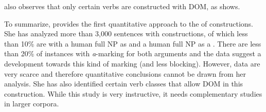 \documentclass[output=paper]{LSP/langsci}
\begin{document}
\citet[166]{Ortiz2011Construcciones} also observes that only certain  verbs are constructed with DOM, as  shows.



\begin{table}
\caption{Verbs with DOM in ditransitive constructions with human direct objects and human indirect objects (\citealt[166]{Ortiz2011Construcciones}; my own translation, KvH)}
\label{11-he-tab:8}
\end{table}


To summarize, \citet{Ortiz2011Construcciones} provides the first quantitative approach to the  of  constructions. She has analyzed more than 3,000 sentences with  constructions, of which less than 10\% are with a human full NP as  and a human full NP as a . There are less than 20\% of instances with \textit{a}-marking for both arguments and the data suggest a development towards this kind of marking (and less blocking). However, data are very scarce and therefore quantitative conclusions cannot be drawn from her analysis. She has also identified certain verb classes that allow DOM in this construction. While this study is very instructive, it needs complementary studies in larger corpora.
\end{document}
